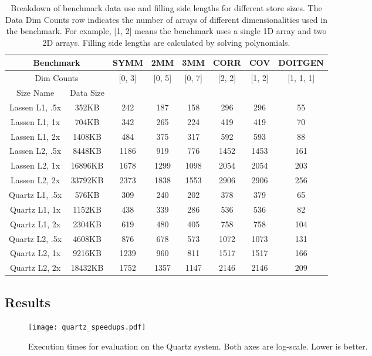 \begin{table}
	\centering
	\begin{tabular}{|c|c||c|c|c|c|c|c|}
		\hline
		\multicolumn{2}{|c|}{Benchmark} & SYMM & 2MM & 3MM & CORR & COV & DOITGEN \\ \hline
		\multicolumn{2}{|c|}{Dim Counts} & [0, 3] & [0, 5] & [0, 7] & [2, 2] & [1, 2] & [1, 1, 1] \\ \hline
	\hline
	Size Name & Data Size &   &   &   &   &   &   \\ \hline
	Lassen L1, .5x & 352KB & 242 & 187 & 158 & 296 & 296 & 55 \\ \hline
	Lassen L1, 1x & 704KB & 342 & 265 & 224 & 419 & 419 & 70 \\ \hline
	Lassen L1, 2x & 1408KB & 484 & 375 & 317 & 592 & 593 & 88 \\ \hline
	Lassen L2, .5x & 8448KB & 1186 & 919 & 776 & 1452 & 1453 & 161 \\ \hline
	Lassen L2, 1x & 16896KB & 1678 & 1299 & 1098 & 2054 & 2054 & 203 \\ \hline
	Lassen L2, 2x & 33792KB & 2373 & 1838 & 1553 & 2906 & 2906 & 256 \\ \hline
	Quartz L1, .5x & 576KB & 309 & 240 & 202 & 378 & 379 & 65 \\ \hline
	Quartz L1, 1x & 1152KB & 438 & 339 & 286 & 536 & 536 & 82 \\ \hline
	Quartz L1, 2x & 2304KB & 619 & 480 & 405 & 758 & 758 & 104 \\ \hline
	Quartz L2, .5x & 4608KB & 876 & 678 & 573 & 1072 & 1073 & 131 \\ \hline
	Quartz L2, 1x & 9216KB & 1239 & 960 & 811 & 1517 & 1517 & 166 \\ \hline
	Quartz L2, 2x & 18432KB & 1752 & 1357 & 1147 & 2146 & 2146 & 209 \\ \hline	
\end{tabular}	
\caption{Breakdown of benchmark data use and filling side lengths for different store sizes. The Data Dim Counts row indicates the number of arrays of different dimensionalities used in the benchmark. For example, [1, 2] means the benchmark uses a single 1D array and two 2D arrays. Filling side lengths are calculated by solving polynomials.}\label{fillingSizes}
\end{table}


\subsection{Results}
\begin{figure}
\texttt{[image: quartz\_speedups.pdf]}
\caption{Execution times for evaluation on the Quartz system. Both axes are log-scale. Lower is better.}
\label{quartzSpeedups}
\end{figure}


